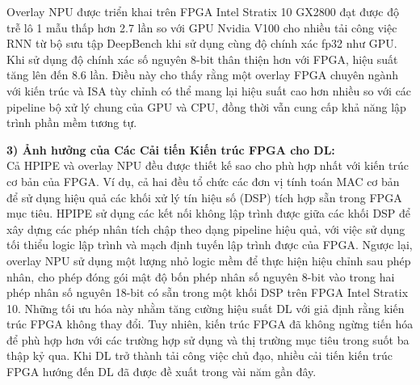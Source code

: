 \documentclass[a4paper]{article}
\begin{document}
Overlay NPU được triển khai trên FPGA Intel Stratix 10 GX2800 đạt được độ trễ lô 1 mẫu thấp hơn 2.7 lần so với GPU Nvidia V100 cho nhiều tải công việc RNN từ bộ sưu tập DeepBench khi sử dụng cùng độ chính xác fp32 như GPU. Khi sử dụng độ chính xác số nguyên 8-bit thân thiện hơn với FPGA, hiệu suất tăng lên đến 8.6 lần. Điều này cho thấy rằng một overlay FPGA chuyên ngành với kiến trúc và ISA tùy chỉnh có thể mang lại hiệu suất cao hơn nhiều so với các pipeline bộ xử lý chung của GPU và CPU, đồng thời vẫn cung cấp khả năng lập trình phần mềm tương tự.

\textbf{3) Ảnh hưởng của Các Cải tiến Kiến trúc FPGA cho DL:} \\
    Cả HPIPE và overlay NPU đều được thiết kế sao cho phù hợp nhất với kiến trúc cơ bản của FPGA. Ví dụ, cả hai đều tổ chức các đơn vị tính toán MAC cơ bản để sử dụng hiệu quả các khối xử lý tín hiệu số (DSP) tích hợp sẵn trong FPGA mục tiêu. HPIPE sử dụng các kết nối không lập trình được giữa các khối DSP để xây dựng các phép nhân tích chập theo dạng pipeline hiệu quả, với việc sử dụng tối thiểu logic lập trình và mạch định tuyến lập trình được của FPGA. Ngược lại, overlay NPU sử dụng một lượng nhỏ logic mềm để thực hiện hiệu chỉnh sau phép nhân, cho phép đóng gói mật độ bốn phép nhân số nguyên 8-bit vào trong hai phép nhân số nguyên 18-bit có sẵn trong một khối DSP trên FPGA Intel Stratix 10. Những tối ưu hóa này nhằm tăng cường hiệu suất DL với giả định rằng kiến trúc FPGA không thay đổi. Tuy nhiên, kiến trúc FPGA đã không ngừng tiến hóa để phù hợp hơn với các trường hợp sử dụng và thị trường mục tiêu trong suốt ba thập kỷ qua. Khi DL trở thành tải công việc chủ đạo, nhiều cải tiến kiến trúc FPGA hướng đến DL đã được đề xuất trong vài năm gần đây.
    
\end{document}
